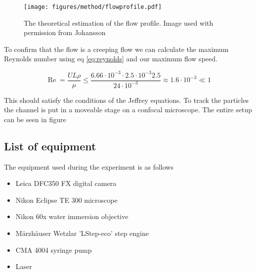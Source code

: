 



\begin{figure}[H]
\begin{center}
\texttt{[image: figures/method/flowprofile.pdf]}
\end{center}
\caption{The theoretical estimation of the flow profile. Image used with permission from Johansson \cite{AntonThesis}}
\label{fig:flowprofile}
\end{figure}


To confirm that the flow is a creeping flow we can calculate the maximum Reynolds number using eq \ref{eq:reynolds} and 
our maximum flow speed. 

\begin{equation}
\operatorname{Re} = \frac{U L \rho}{\mu} 
\leq \frac{6.66\cdot 10^{-3} \cdot 2.5 \cdot 10^{-3} 2.5 }{24 \cdot 10^{-3}} 
\approx	 	1.6  \cdot 10^{-3} \ll 1
\end{equation}

This should satisfy the conditions of the Jeffrey equations. To track the particles the channel is put in a moveable stage on a confocal microscope. The entire setup can be seen in figure 



\subsection{List of equipment}
 The equipment used during the experiment is as follows
\begin{itemize}
\item Leica DFC350 FX digital camera 
\item Nikon Eclipse TE 300 microscope
\item Nikon 60x water immersion objective
\item Märzhäuser Wetzlar 'LStep-eco' step engine
\item CMA 4004 syringe pump
\item Laser 
\end{itemize}

%
%
